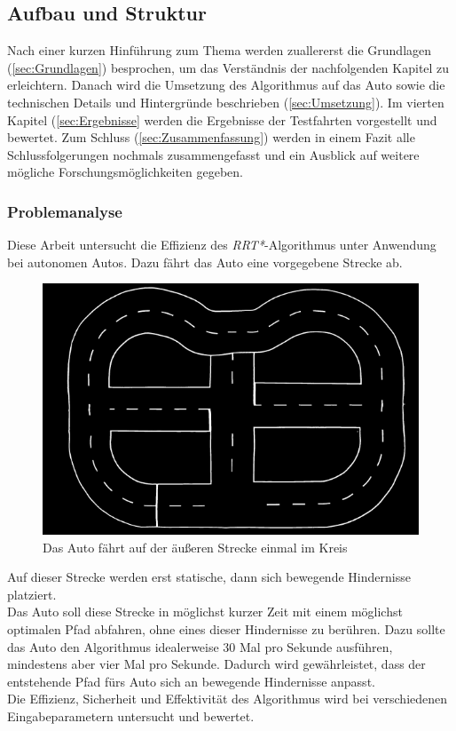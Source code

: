 \subsection{Aufbau und Struktur}
Nach einer kurzen Hinführung zum Thema werden zuallererst die Grundlagen (\ref{sec:Grundlagen}) besprochen, um das Verständnis der nachfolgenden Kapitel zu erleichtern. Danach wird die Umsetzung des Algorithmus auf das Auto sowie die technischen Details und Hintergründe beschrieben (\ref{sec:Umsetzung}). Im vierten Kapitel (\ref{sec:Ergebnisse} werden die Ergebnisse der Testfahrten vorgestellt und bewertet. Zum Schluss (\ref{sec:Zusammenfassung}) werden in einem Fazit alle Schlussfolgerungen nochmals zusammengefasst und ein Ausblick auf weitere mögliche Forschungsmöglichkeiten gegeben. \\ 
\subsubsection{Problemanalyse}
Diese Arbeit untersucht die Effizienz des\textit{ RRT*}-Algorithmus unter Anwendung bei autonomen Autos. Dazu fährt das Auto eine vorgegebene Strecke ab.
\begin{figure}
\centering
\includegraphics[scale=0.5]{Bilder/fu_robotics_lab_map_600x400.png} 
\caption{Das Auto fährt auf der äußeren Strecke einmal im Kreis}
\end{figure}
 Auf dieser Strecke werden erst statische, dann sich bewegende Hindernisse platziert. \\
Das Auto soll diese Strecke in möglichst kurzer Zeit mit einem möglichst optimalen Pfad abfahren, ohne eines dieser Hindernisse zu berühren. Dazu sollte das Auto den Algorithmus idealerweise 30 Mal pro Sekunde ausführen, mindestens aber vier Mal pro Sekunde. Dadurch wird gewährleistet, dass der entstehende Pfad fürs Auto sich an bewegende Hindernisse anpasst. \\
Die Effizienz, Sicherheit und Effektivität des Algorithmus wird bei verschiedenen Eingabeparametern untersucht und bewertet. \\

